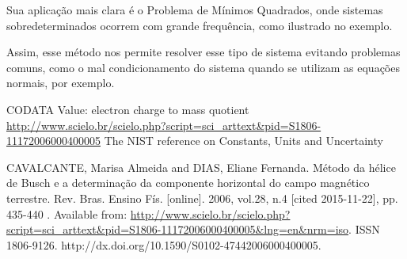 \documentclass[a4paper,11pt]{article}
\begin{document}
        Sua aplicação mais clara é o Problema de Mínimos Quadrados, onde sistemas sobredeterminados ocorrem com grande frequência, como ilustrado no exemplo.

        Assim, esse método nos permite resolver esse tipo de sistema evitando problemas comuns, como o mal condicionamento do sistema quando se utilizam as equações normais, por exemplo.


    \begin{thebibliography}{9}
            CODATA Value: electron charge to mass quotient
            \url{http://www.scielo.br/scielo.php?script=sci_arttext&pid=S1806-11172006000400005}
            The NIST reference on Constants, Units and Uncertainty

            CAVALCANTE, Marisa Almeida  and  DIAS, Eliane Fernanda. Método da hélice de Busch e a determinação da componente horizontal do campo magnético terrestre. Rev. Bras. Ensino Fís. [online]. 2006, vol.28, n.4 [cited  2015-11-22], pp. 435-440 . Available from: \url{http://www.scielo.br/scielo.php?script=sci_arttext&pid=S1806-11172006000400005&lng=en&nrm=iso}. ISSN 1806-9126.  http://dx.doi.org/10.1590/S0102-47442006000400005.
    \end{thebibliography}
\end{document}
